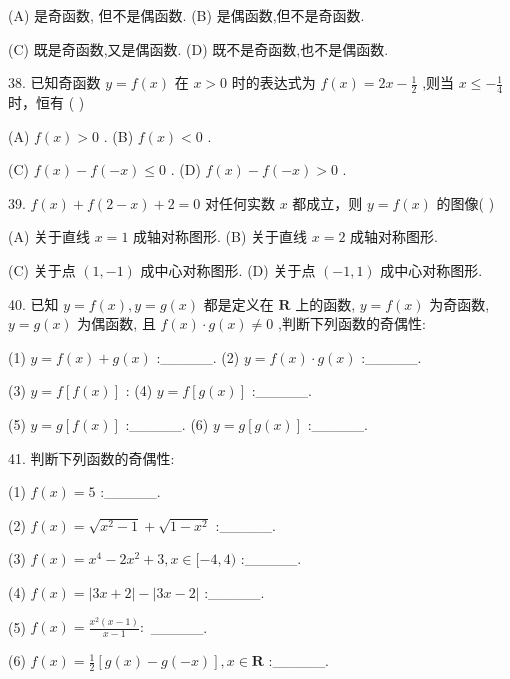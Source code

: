 \documentclass[10pt]{article}
\begin{document}
(A) 是奇函数, 但不是偶函数. (B) 是偶函数,但不是奇函数.

(C) 既是奇函数,又是偶函数. (D) 既不是奇函数,也不是偶函数.

38. 已知奇函数 \(y = f\left( x\right)\) 在 \(x > 0\) 时的表达式为 \(f\left( x\right)  = {2x} - \frac{1}{2}\) ,则当 \(x \leq   - \frac{1}{4}\) 时，恒有 ( )

(A) \(f\left( x\right)  > 0\) . (B) \(f\left( x\right)  < 0\) .

(C) \(f\left( x\right)  - f\left( {-x}\right)  \leq  0\) . (D) \(f\left( x\right)  - f\left( {-x}\right)  > 0\) .

39. \(f\left( x\right)  + f\left( {2 - x}\right)  + 2 = 0\) 对任何实数 \(x\) 都成立，则 \(y = f\left( x\right)\) 的图像( )

(A) 关于直线 \(x = 1\) 成轴对称图形. (B) 关于直线 \(x = 2\) 成轴对称图形.

(C) 关于点 \(\left( {1, - 1}\right)\) 成中心对称图形. (D) 关于点 \(\left( {-1,1}\right)\) 成中心对称图形.

40. 已知 \(y = f\left( x\right) ,y = g\left( x\right)\) 都是定义在 \(\mathbf{R}\) 上的函数, \(y = f\left( x\right)\) 为奇函数, \(y = g\left( x\right)\) 为偶函数, 且 \(f\left( x\right)  \cdot  g\left( x\right)  \neq  0\) ,判断下列函数的奇偶性:

(1) \(y = f\left( x\right)  + g\left( x\right)\) :\_\_\_\_\_. (2) \(y = f\left( x\right)  \cdot  g\left( x\right)\) :\_\_\_\_\_.

(3) \(y = f\left\lbrack  {f\left( x\right) }\right\rbrack\) : (4) \(y = f\left\lbrack  {g\left( x\right) }\right\rbrack\) :\_\_\_\_\_.

(5) \(y = g\left\lbrack  {f\left( x\right) }\right\rbrack\) :\_\_\_\_\_. (6) \(y = g\left\lbrack  {g\left( x\right) }\right\rbrack\) :\_\_\_\_\_.

41. 判断下列函数的奇偶性:

(1) \(f\left( x\right)  = 5\) :\_\_\_\_\_.

(2) \(f\left( x\right)  = \sqrt{{x}^{2} - 1} + \sqrt{1 - {x}^{2}}\) :\_\_\_\_\_.

(3) \(f\left( x\right)  = {x}^{4} - 2{x}^{2} + 3,x \in  \lbrack  - 4,4)\) :\_\_\_\_\_.

(4) \(f\left( x\right)  = \left| {{3x} + 2}\right|  - \left| {{3x} - 2}\right|\) :\_\_\_\_\_.

(5) \(f\left( x\right)  = \frac{{x}^{2}\left( {x - 1}\right) }{x - 1} :\) \_\_\_\_\_.

(6) \(f\left( x\right)  = \frac{1}{2}\left\lbrack  {g\left( x\right)  - g\left( {-x}\right) }\right\rbrack  ,x \in  \mathbf{R}\) :\_\_\_\_\_.
\end{document}
